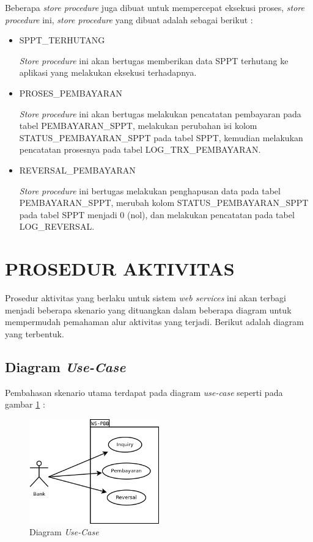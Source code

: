 \documentclass[pdftex,12pt, oneside]{article}
\begin{document}
Beberapa \textit{store procedure} juga dibuat untuk mempercepat eksekusi proses, \textit{store procedure} ini, \textit{store procedure} yang dibuat adalah sebagai berikut :

\begin{itemize}
  \item SPPT\_TERHUTANG
  
  \textit{Store procedure} ini akan bertugas memberikan data SPPT terhutang ke aplikasi yang melakukan eksekusi terhadapnya.
  
  \item PROSES\_PEMBAYARAN
  
  \textit{Store procedure} ini akan bertugas melakukan pencatatan pembayaran pada tabel PEMBAYARAN\_SPPT, melakukan perubahan isi kolom STATUS\_PEMBAYARAN\_SPPT pada tabel SPPT, kemudian melakukan pencatatan prosesnya pada tabel LOG\_TRX\_PEMBAYARAN.
  
  \item REVERSAL\_PEMBAYARAN
  
  \textit{Store procedure} ini bertugas melakukan penghapusan data pada tabel PEMBAYARAN\_SPPT, merubah kolom STATUS\_PEMBAYARAN\_SPPT pada tabel SPPT menjadi 0 (nol), dan melakukan pencatatan pada tabel LOG\_REVERSAL.
\end{itemize}

\section{PROSEDUR AKTIVITAS}

Prosedur aktivitas yang berlaku untuk sistem \textit{web services} ini akan terbagi menjadi beberapa skenario yang dituangkan dalam beberapa diagram untuk mempermudah pemahaman alur aktivitas yang terjadi. Berikut adalah diagram yang terbentuk.

\subsection{Diagram \textit{Use-Case}}

Pembahasan skenario utama terdapat pada diagram \textit{use-case} seperti pada gambar \ref{fig:uml-use-case} :

\begin{figure}[H]
  \centering
  \includegraphics[width=0.5\textwidth]{./resources/diagram/uml-use-case}
  \caption{Diagram \textit{Use-Case}}
  \label{fig:uml-use-case}
\end{figure}
\end{document}

